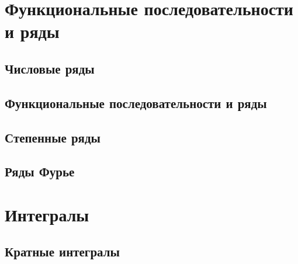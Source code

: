 \documentclass[a4paper,12pt]{book}
\theoremstyle{plain}
\theoremstyle{definition}
\theoremstyle{remark}
\begin{document}
  
  \tableofcontents

  \part{Функциональные последовательности и ряды}
  \chapter{Числовые ряды}
  
  \chapter{Функциональные последовательности и ряды}
  
  \chapter{Степенные ряды}
  
  \chapter{Ряды Фурье}
  
  \part{Интегралы}
  \chapter{Кратные интегралы}
  
\end{document}
